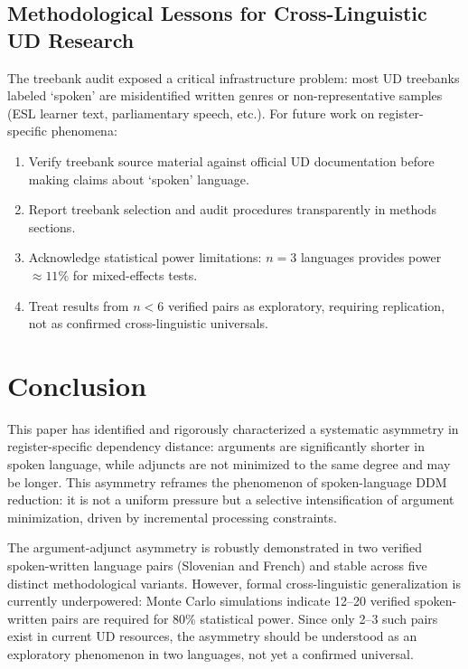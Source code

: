 \documentclass[11pt,letterpaper]{article}
\begin{document}
\subsection{Methodological Lessons for Cross-Linguistic UD Research}

The treebank audit exposed a critical infrastructure problem: most UD treebanks labeled `spoken' are misidentified written genres or non-representative samples (ESL learner text, parliamentary speech, etc.). For future work on register-specific phenomena:

\begin{enumerate}
  \item Verify treebank source material against official UD documentation before making claims about `spoken' language.
  \item Report treebank selection and audit procedures transparently in methods sections.
  \item Acknowledge statistical power limitations: $n=3$ languages provides power $\approx 11\%$ for mixed-effects tests.
  \item Treat results from $n < 6$ verified pairs as exploratory, requiring replication, not as confirmed cross-linguistic universals.
\end{enumerate}

\section{Conclusion}

This paper has identified and rigorously characterized a systematic asymmetry in register-specific dependency distance: arguments are significantly shorter in spoken language, while adjuncts are not minimized to the same degree and may be longer. This asymmetry reframes the phenomenon of spoken-language DDM reduction: it is not a uniform pressure but a selective intensification of argument minimization, driven by incremental processing constraints.

The argument-adjunct asymmetry is robustly demonstrated in two verified spoken-written language pairs (Slovenian and French) and stable across five distinct methodological variants. However, formal cross-linguistic generalization is currently underpowered: Monte Carlo simulations indicate 12--20 verified spoken-written pairs are required for 80\% statistical power. Since only 2--3 such pairs exist in current UD resources, the asymmetry should be understood as an exploratory phenomenon in two languages, not yet a confirmed universal.
\end{document}
